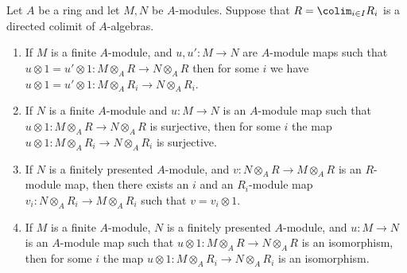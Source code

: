 \begin{lemma}
\label{lemma-module-map-property-in-colimit}
Let $A$ be a ring and let $M, N$ be $A$-modules.
Suppose that $R = \colim_{i \in I} R_i$ is a directed colimit
of $A$-algebras.
\begin{enumerate}
\item If $M$ is a finite $A$-module, and $u, u' : M \to N$ are
$A$-module maps such that
$u \otimes 1 = u' \otimes 1 : M \otimes_A R \to N \otimes_A R$
then for some $i$ we have
$u \otimes 1 = u' \otimes 1 : M \otimes_A R_i \to N \otimes_A R_i$.
\item If $N$ is a finite $A$-module and $u : M \to N$ is an $A$-module
map such that $u \otimes 1 : M \otimes_A R \to N \otimes_A R$ is surjective,
then for some $i$ the map $u \otimes 1 : M \otimes_A R_i \to N \otimes_A R_i$
is surjective.
\item If $N$ is a finitely presented $A$-module, and
$v : N \otimes_A R \to M \otimes_A R$ is an $R$-module
map, then there exists an $i$ and an $R_i$-module map
$v_i : N \otimes_A R_i \to M \otimes_A R_i$ such that $v = v_i \otimes 1$.
\item If $M$ is a finite $A$-module, $N$ is a finitely presented $A$-module,
and $u : M \to N$ is an $A$-module map such that
$u \otimes 1 : M \otimes_A R \to N \otimes_A R$ is an isomorphism, then
for some $i$ the map $u \otimes 1 : M \otimes_A R_i \to N \otimes_A R_i$
is an isomorphism.
\end{enumerate}
\end{lemma}

